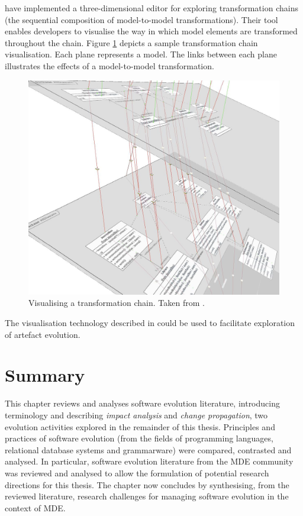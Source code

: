\cite{pilgrim08constructing} have implemented a three-dimensional editor for exploring transformation chains (the sequential composition of model-to-model transformations). Their tool enables developers to visualise the way in which model elements are transformed throughout the chain. Figure \ref{fig:transformation-chains} depicts a sample transformation chain visualisation. Each plane represents a model. The links between each plane illustrates the effects of a model-to-model transformation.

\begin{figure}[htbp]
  \begin{center}
    \leavevmode
    \includegraphics[scale=0.25]{3.LiteratureReview/images/transformation-chain.png}
  \end{center}
  \caption[Visualising a transformation chain]{Visualising a transformation chain. Taken from \cite{pilgrim08constructing}.}
  \label{fig:transformation-chains}
\end{figure}

The visualisation technology described in \cite{pilgrim08constructing} could be used to facilitate exploration of artefact evolution.

\section{Summary}
\label{sec:literature_review_summary}
This chapter reviews and analyses software evolution literature, introducing terminology and describing \emph{impact analysis} and \emph{change propagation}, two evolution activities explored in the remainder of this thesis. Principles and practices of software evolution (from the fields of programming languages, relational database systems and grammarware) were compared, contrasted and analysed. In particular, software evolution literature from the MDE community was reviewed and analysed to allow the formulation of potential research directions for this thesis. The chapter now concludes by synthesising, from the reviewed literature, research challenges for managing software evolution in the context of MDE.

